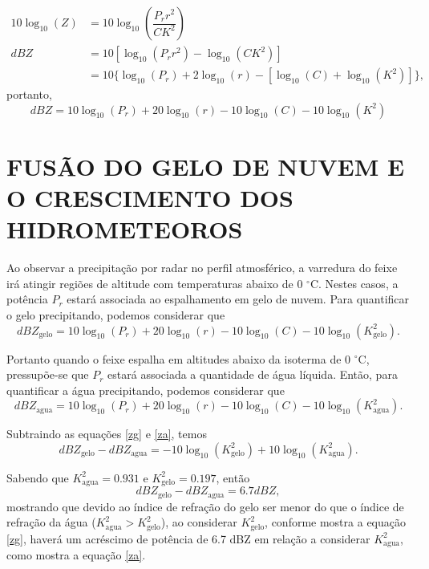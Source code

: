 \begin{align}
10\log_{10}(Z)  &= 10\log_{10} \left( \dfrac{P_r r^2}{C K^2} \right)\\
dBZ &= 10\left[ \log_{10}(P_r r^2) - \log_{10}(C K^2)     \right]\\
      &=  10 \lbrace \log_{10}(P_r)+ 2\log_{10}(r) - [ \log_{10}(C) + \log_{10}(K^2)]  \rbrace,
\end{align}
portanto,
\begin{equation}
dBZ =  10\log_{10}(P_r) + 20\log_{10}(r) - 10\log_{10}(C) - 10\log_{10}(K^2)
\end{equation}

\section{FUSÃO DO GELO DE NUVEM E O CRESCIMENTO DOS HIDROMETEOROS}
\label{derretimento}

Ao observar a precipitação por radar no perfil atmosférico, a varredura do feixe irá atingir regiões de altitude com temperaturas abaixo de 0 $^{\circ}$C. Nestes casos, a potência $P_r$ estará associada ao espalhamento em gelo de nuvem. Para quantificar o gelo precipitando, podemos considerar que 
\begin{equation}
dBZ_{\mathrm{gelo}} =  10\log_{10}(P_r) + 20\log_{10}(r) - 10\log_{10}(C) - 10\log_{10}(K_{\mathrm{gelo}}^2).
\label{zg}
\end{equation}

Portanto quando o feixe espalha em altitudes abaixo da isoterma de 0 $^{\circ}$C, pressupõe-se que $P_r$ estará associada a quantidade de água líquida. Então, para quantificar a água precipitando, podemos considerar que
\begin{equation}
dBZ_{\mathrm{agua}} =  10\log_{10}(P_r) + 20\log_{10}(r) - 10\log_{10}(C) - 10\log_{10}(K_{\mathrm{agua}}^2).
\label{za}
\end{equation}

Subtraindo as equações \ref{zg} e \ref{za}, temos
\begin{equation}
dBZ_{\mathrm{gelo}} - dBZ_{\mathrm{agua}} = - 10\log_{10}(K_{\mathrm{gelo}}^2 )+ 10\log_{10}(K_{\mathrm{agua}}^2).
\end{equation}

Sabendo que $K_{\mathrm{agua}}^2 = 0.931$ e $K_{\mathrm{gelo}}^2= 0.197$, então 
\begin{equation}
dBZ_{\mathrm{gelo}} - dBZ_{\mathrm{agua}} =   6.7dBZ,
\end{equation}
mostrando que devido ao índice de refração do gelo ser menor do que o índice de refração da água ($K_{\mathrm{agua}}^2 > K_{\mathrm{gelo}}^2$), ao considerar $K_{\mathrm{gelo}}^2$, conforme mostra a equação \ref{zg}, haverá um acréscimo de potência de  6.7 dBZ em relação a considerar $K_{\mathrm{agua}}^2$, como mostra a equação \ref{za}.

